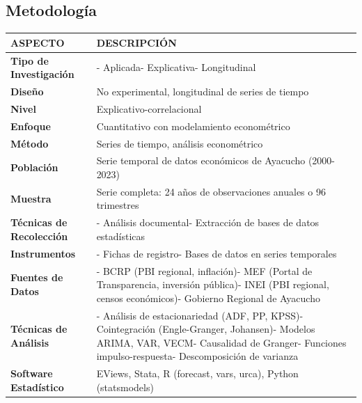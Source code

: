 \documentclass[
  man,
  floatsintext,
  longtable,
  a4paper,
  nolmodern,
  notxfonts,
  notimes,
  12pt,
  colorlinks=true,linkcolor=blue,citecolor=blue,urlcolor=blue]{apa7}
\newcounter{none} %
\begin{document}
\subsection{Metodología}\label{metodologuxeda-4}

{\def\LTcaptype{none} %
\begin{longtable}[]{@{}
  >{\raggedright\arraybackslash}p{}
  >{\raggedright\arraybackslash}p{}@{}}
\toprule\noalign{}
\begin{minipage}[b]{\linewidth}\raggedright
ASPECTO
\end{minipage} & \begin{minipage}[b]{\linewidth}\raggedright
DESCRIPCIÓN
\end{minipage} \\
\midrule\noalign{}
\endhead
\bottomrule\noalign{}
\endlastfoot
\textbf{Tipo de Investigación} & - Aplicada- Explicativa-
Longitudinal \\
\textbf{Diseño} & No experimental, longitudinal de series de tiempo \\
\textbf{Nivel} & Explicativo-correlacional \\
\textbf{Enfoque} & Cuantitativo con modelamiento econométrico \\
\textbf{Método} & Series de tiempo, análisis econométrico \\
\textbf{Población} & Serie temporal de datos económicos de Ayacucho
(2000-2023) \\
\textbf{Muestra} & Serie completa: 24 años de observaciones anuales o 96
trimestres \\
\textbf{Técnicas de Recolección} & - Análisis documental- Extracción de
bases de datos estadísticas \\
\textbf{Instrumentos} & - Fichas de registro- Bases de datos en series
temporales \\
\textbf{Fuentes de Datos} & - BCRP (PBI regional, inflación)- MEF
(Portal de Transparencia, inversión pública)- INEI (PBI regional, censos
económicos)- Gobierno Regional de Ayacucho \\
\textbf{Técnicas de Análisis} & - Análisis de estacionariedad (ADF, PP,
KPSS)- Cointegración (Engle-Granger, Johansen)- Modelos ARIMA, VAR,
VECM- Causalidad de Granger- Funciones impulso-respuesta- Descomposición
de varianza \\
\textbf{Software Estadístico} & EViews, Stata, R (forecast, vars, urca),
Python (statsmodels) \\
\end{longtable}
}
\end{document}
